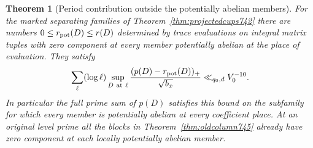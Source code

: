 \documentclass[a4paper,11pt]{article}
\newtheorem{theorem}[proposition]{Theorem}
\theoremstyle{definition}
\theoremstyle{remark}
\numberwithin{equation}{section}
\begin{document}
\begin{theorem}[Period contribution outside the potentially abelian members]
\leavevmode\label{thm:potentialperiod746}
For the marked separating families of Theorem~\ref{thm:projectedcups742}
there are numbers \(0\le r_{\rm pot}(D)\le r(D)\) determined by
trace evaluations on integral matrix tuples with zero component
at every member potentially abelian at the place of evaluation.
They satisfy
\[
    \sum_\ell(\log\ell)\sup_{D\ {\rm at}\ \ell}
       \frac{(p(D)-r_{\rm pot}(D))_+}{\sqrt{b_x}}
                 \ll_{q_0,d} V_0^{-10}.
\]
In particular the full prime sum of \(p(D)\) satisfies this bound
on the subfamily for which every member is potentially abelian
at every coefficient place. At an original level prime all
the blocks in Theorem~\ref{thm:oldcolumn745} already have zero
component at each locally potentially abelian member.
\end{theorem}
\end{document}

